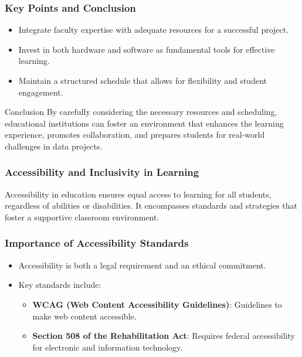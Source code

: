 \documentclass[aspectratio=169]{beamer}
\begin{document}
\begin{frame}[fragile]
    \frametitle{Key Points and Conclusion}
    \begin{itemize}
        \item Integrate faculty expertise with adequate resources for a successful project.
        \item Invest in both hardware and software as fundamental tools for effective learning.
        \item Maintain a structured schedule that allows for flexibility and student engagement.
    \end{itemize}
    \begin{block}{Conclusion}
        By carefully considering the necessary resources and scheduling, educational institutions can foster an environment that enhances the learning experience, promotes collaboration, and prepares students for real-world challenges in data projects.
    \end{block}
\end{frame}

\begin{frame}[fragile]
    \frametitle{Accessibility and Inclusivity in Learning}
    Accessibility in education ensures equal access to learning for all students, regardless of abilities or disabilities. It encompasses standards and strategies that foster a supportive classroom environment.
\end{frame}

\begin{frame}[fragile]
    \frametitle{Importance of Accessibility Standards}
    \begin{itemize}
        \item Accessibility is both a legal requirement and an ethical commitment.
        \item Key standards include:
        \begin{itemize}
            \item \textbf{WCAG (Web Content Accessibility Guidelines)}: Guidelines to make web content accessible.
            \item \textbf{Section 508 of the Rehabilitation Act}: Requires federal accessibility for electronic and information technology.
        \end{itemize}
    \end{itemize}
\end{frame}
\end{document}
